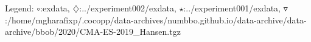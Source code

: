 Legend: {\color{NavyBlue}$\circ$}:exdata, {\color{Magenta}$\diamondsuit$}:../experiment002/exdata, {\color{Orange}$\star$}:../experiment001/exdata, {\color{CornflowerBlue}$\triangledown$}:/home/mgharafixp/.cocopp/data-archives/numbbo.github.io/data-archive/data-archive/bbob/2020/CMA-ES-2019\_Hansen.tgz